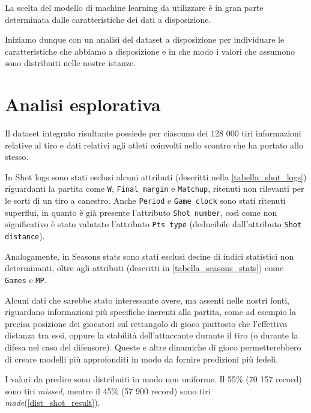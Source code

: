 La scelta del modello di machine learning da utilizzare è in gran parte determinata dalle caratteristiche dei dati a disposizione.

Iniziamo dunque con un analisi del dataset a disposizione per individuare le caratteristiche che abbiamo a disposizione e in che modo i valori che assumono sono distribuiti nelle nostre istanze.

\section{Analisi esplorativa}

\par
Il dataset integrato risultante possiede per ciascuno dei 128 000 tiri informazioni relative al tiro e dati relativi agli atleti coinvolti nello scontro che ha portato allo stesso.
\par

In Shot logs sono stati esclusi alcuni attributi (descritti nella \autoref{tabella_shot_logs}) riguardanti la partita come \texttt{W}, \texttt{Final margin} e \texttt{Matchup}, ritenuti non rilevanti per le sorti di un tiro a canestro.
Anche \texttt{Period} e \texttt{Game clock} sono stati ritenuti superflui, in quanto è già presente l'attributo \texttt{Shot number}, così come non significativo è stato valutato l'attributo \texttt{Pts type} (deducibile dall'attributo \texttt{Shot distance}). 
\par
Analogamente, in Seasons stats sono stati esclusi decine di indici statistici non determinanti, oltre agli attributi (descritti in \autoref{tabella_seasons_stats}) come \texttt{Games} e \texttt{MP}.

\par

Alcuni dati che sarebbe stato interessante avere, ma assenti nelle nostri fonti, riguardano informazioni più specifiche inerenti alla partita, come ad esempio la precisa posizione dei giocatori sul rettangolo di gioco piuttosto che l'effettiva distanza tra essi, oppure la stabilità dell'attaccante durante il tiro (o durante la difesa nel caso del difensore). Queste e altre dinamiche di gioco permetterebbero di creare modelli più approfonditi in modo da fornire predizioni più fedeli.

\par
I valori da predire sono distribuiti in modo non uniforme. Il 55\% (70 157 record) sono tiri \textit{missed}, mentre il 45\% (57 900 record) sono tiri \textit{made}(\autoref{dist_shot_result}).

